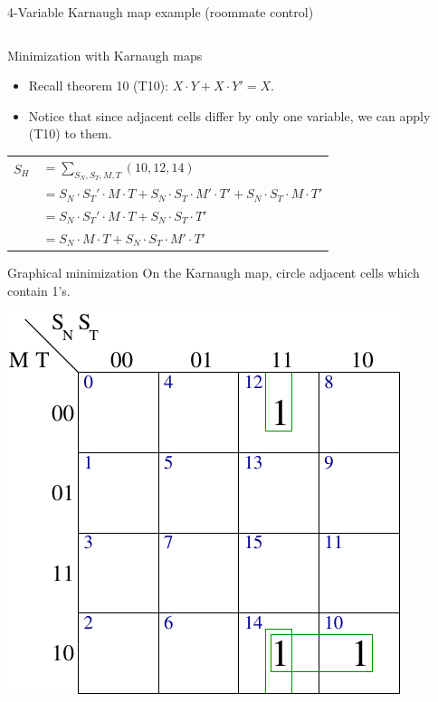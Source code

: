 \begin{frame}{4-Variable Karnaugh map example (roommate control)}
\begin{columns}
\begin{column}{5cm}
\begin{center}
      \end{center}
    \end{column}
  \end{columns}
\end{frame}

\begin{frame}{Minimization with Karnaugh maps}
  \begin{itemize}
    \item Recall theorem 10 (T10): $X \cdot Y + X \cdot Y' = X$.
    \item Notice that since adjacent cells differ by only one variable, we can apply (T10) to them.
  \end{itemize}
  \begin{example}
    \begin{tabular}{rl}
    $S_H$ & $= \sum_{S_N,S_T,M,T}(10,12,14)$ \\
          & $= S_N \cdot S_T' \cdot M \cdot T + S_N \cdot S_T \cdot M'\cdot T'+ S_N \cdot S_T \cdot M \cdot T'$ \\
          & $= S_N \cdot S_T' \cdot M \cdot T + S_N \cdot S_T \cdot T'$ \\
          & $= S_N \cdot M \cdot T + S_N \cdot S_T \cdot M' \cdot T'$ \\
  \end{tabular}
  \end{example}
\end{frame}

\begin{frame}{Graphical minimization}
  On the Karnaugh map, circle adjacent cells which contain 1's.
  \begin{center}
    \includegraphics[scale=0.8]{4VariableRoommateControlKMapMinimized}
  \end{center}
\end{frame}

